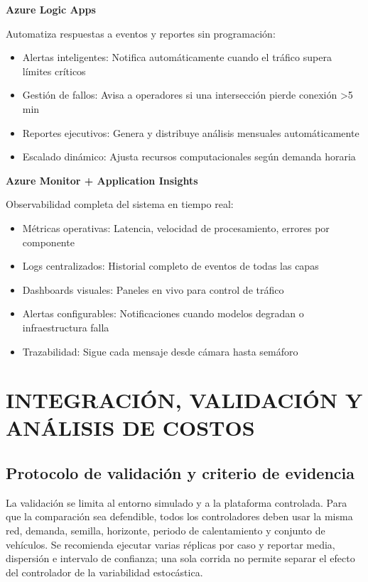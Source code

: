 \documentclass[12pt,a4paper,oneside]{report}
\begin{document}
\textbf{Azure Logic Apps}

Automatiza respuestas a eventos y reportes sin programación:

\begin{itemize}
\item
  Alertas inteligentes: Notifica automáticamente cuando el tráfico supera límites críticos
\item
  Gestión de fallos: Avisa a operadores si una intersección pierde conexión \textgreater5 min
\item
  Reportes ejecutivos: Genera y distribuye análisis mensuales automáticamente
\item
  Escalado dinámico: Ajusta recursos computacionales según demanda horaria
\end{itemize}

\textbf{Azure Monitor + Application Insights}

Observabilidad completa del sistema en tiempo real:

\begin{itemize}
\item
  Métricas operativas: Latencia, velocidad de procesamiento, errores por componente
\item
  Logs centralizados: Historial completo de eventos de todas las capas
\item
  Dashboards visuales: Paneles en vivo para control de tráfico
\item
  Alertas configurables: Notificaciones cuando modelos degradan o infraestructura falla
\item
  Trazabilidad: Sigue cada mensaje desde cámara hasta semáforo
\end{itemize}

\chapter{INTEGRACIÓN, VALIDACIÓN Y ANÁLISIS DE COSTOS}\label{capuxedtulo-7-integraciuxf3n-validaciuxf3n-y-anuxe1lisis-de-costos}

\section{Protocolo de validación y criterio de evidencia}\label{protocolo-validacion-v2}

La validación se limita al entorno simulado y a la plataforma controlada. Para que la comparación sea defendible, todos los controladores deben usar la misma red, demanda, semilla, horizonte, periodo de calentamiento y conjunto de vehículos. Se recomienda ejecutar varias réplicas por caso y reportar media, dispersión e intervalo de confianza; una sola corrida no permite separar el efecto del controlador de la variabilidad estocástica.
\end{document}
